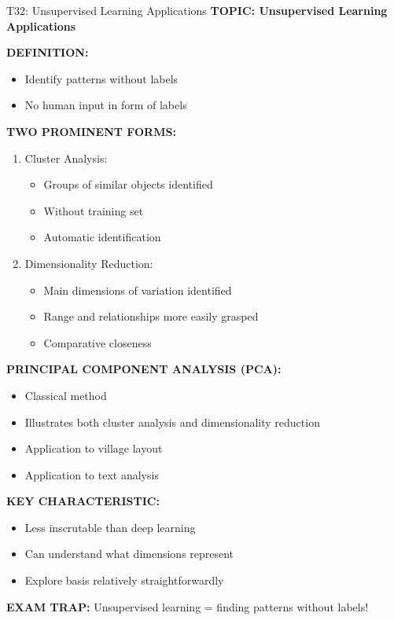 \documentclass[8pt]{beamer}
\begin{document}
	\begin{frame}{T32: Unsupervised Learning Applications}
		\fontsize{6.5}{7.5}\selectfont
		\textbf{TOPIC: Unsupervised Learning Applications}
		
		\vspace{0.1cm}
		\textbf{DEFINITION:}
		\begin{itemize}
			\item Identify patterns without labels
			\item No human input in form of labels
		\end{itemize}
		
		\vspace{0.1cm}
		\textbf{TWO PROMINENT FORMS:}
		\begin{enumerate}
			\item \textcolor{myblue}{Cluster Analysis:}
			\begin{itemize}
				\item Groups of similar objects identified
				\item Without training set
				\item Automatic identification
			\end{itemize}
			\item \textcolor{myblue}{Dimensionality Reduction:}
			\begin{itemize}
				\item Main dimensions of variation identified
				\item Range and relationships more easily grasped
				\item Comparative closeness
			\end{itemize}
		\end{enumerate}
		
		\vspace{0.1cm}
		\textbf{PRINCIPAL COMPONENT ANALYSIS (PCA):}
		\begin{itemize}
			\item Classical method
			\item Illustrates both cluster analysis and dimensionality reduction
			\item Application to village layout
			\item Application to text analysis
		\end{itemize}
		
		\vspace{0.1cm}
		\textbf{KEY CHARACTERISTIC:}
		\begin{itemize}
			\item Less inscrutable than deep learning
			\item Can understand what dimensions represent
			\item Explore basis relatively straightforwardly
		\end{itemize}
		
		\textcolor{myred}{\textbf{EXAM TRAP:}} Unsupervised learning = \textcolor{myblue}{finding patterns without labels}!
	\end{frame}
	
\end{document}
